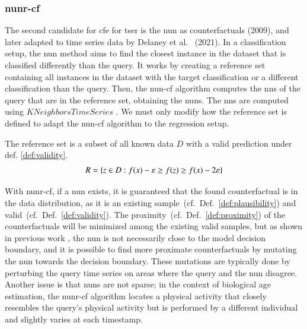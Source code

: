 \subsubsection{\gls{nunr}-\gls{cf}}
\label{sec:methods:nun}
The second candidate for \gls{cfe} for \gls{tser} is the \gls{nun} as counterfactuals \cite{nugent_gaining_2009} (2009), and later adapted to time series data by Delaney et al.~\cite{delaney_instance-based_2021} (2021). In a classification setup, the \gls{nun} method aims to find the closest instance in the dataset that is classified differently than the query. It works by creating a reference set containing all instances in the dataset with the target classification or a different classification than the query. Then, the \gls{nun}-\gls{cf} algorithm computes the \gls{nns} of the query that are in the reference set, obtaining the \gls{nuns}. The \gls{nns} are computed using $KNeighborsTimeSeries$ \cite{tavenard_tslearn_2020}.
We must only modify how the reference set is defined to adapt the \gls{nun}-\gls{cf} algorithm to the regression setup.
\begin{definition}
    \label{def:ref-set}
    The reference set is a subset of all known data $D$ with a valid prediction under def. \ref{def:validity}.
    \[
        R = \{z \in D : f(x) - \varepsilon \geq f(z) \geq f(x) - 2\varepsilon\}
    \]
\end{definition}
With \gls{nunr}-\gls{cf}, if a \gls{nun} exists, it is guaranteed that the found counterfactual is in the data distribution, as it is an existing sample~(cf.~Def.~\ref{def:plausibility}) and valid~(cf.~Def.~\ref{def:validity}). The proximity~(cf.~Def.~\ref{def:proximity}) of the counterfactuals will be minimized among the existing valid samples, but as shown in previous work \cite{delaney_instance-based_2021, hagen_dice_2020}, the \gls{nun} is not necessarily close to the model decision boundary, and it is possible to find more proximate counterfactuals by mutating the \gls{nun} towards the decision boundary. These mutations are typically done by perturbing the query time series on areas where the query and the \gls{nun} disagree. Another issue is that \gls{nuns} are not sparse; in the context of biological age estimation, the \gls{nunr}-\gls{cf} algorithm locates a physical activity that closely resembles the query's physical activity but is performed by a different individual and slightly varies at each timestamp.


